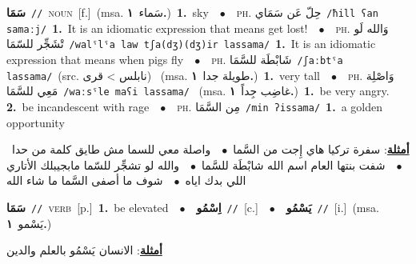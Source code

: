 \documentclass[10pt,a4paper,twoside]{article} %
\begin{document}
\begin{multicols}{2}
{\setlength\topsep{0pt}\textbf{\foreignlanguage{arabic}{سَمَا}}\ {\color{gray}\texttt{//}\color{black}}\ \textsc{noun}\ [f.]\ \color{gray}(msa. \foreignlanguage{arabic}{سَماء}~\foreignlanguage{arabic}{\textbf{١.}})\color{black}\ \textbf{1.}~sky\ \ $\bullet$\ \ \textsc{ph.} \color{gray} \foreignlanguage{arabic}{حِلّ عَن سَمَاي}\color{black}\ {\color{gray}\texttt{/{\sffamily ħill ʕan samaːj}/}\color{black}}\ \textbf{1.}~It is an idiomatic expression that means get lost!\ \ $\bullet$\ \ \textsc{ph.} \color{gray} \foreignlanguage{arabic}{وَالله لَو تْشَجِّر للسّمَا}\color{black}\ {\color{gray}\texttt{/{\sffamily walˤlˤa law tʃa(dʒ)(dʒ)ir lassama}/}\color{black}}\ \textbf{1.}~It is an idiomatic expression that means when pigs fly\ \ $\bullet$\ \ \textsc{ph.} \color{gray} \foreignlanguage{arabic}{شَابْطَة للسَّمَا}\color{black}\ {\color{gray}\texttt{/{\sffamily ʃaːbtˤa lassama}/}\color{black}}\ \color{gray}(src. \foreignlanguage{arabic}{نابلس > قرى})\color{black}\ \color{gray} (msa. \foreignlanguage{arabic}{طويلة جدا}~\foreignlanguage{arabic}{\textbf{١.}})\color{black}\ \textbf{1.}~very tall\ \ $\bullet$\ \ \textsc{ph.} \color{gray} \foreignlanguage{arabic}{وَاصْلِة مَعِي للسَّمَا}\color{black}\ {\color{gray}\texttt{/{\sffamily waːsˤle maʕi lassama}/}\color{black}}\ \color{gray} (msa. \foreignlanguage{arabic}{غاضِب جِداً}~\foreignlanguage{arabic}{\textbf{١.}})\color{black}\ \textbf{1.}~be very angry.  \textbf{2.}~be incandescent with rage\ \ $\bullet$\ \ \textsc{ph.} \color{gray} \foreignlanguage{arabic}{مِن السَّمَا}\color{black}\ {\color{gray}\texttt{/{\sffamily min ʔissama}/}\color{black}}\ \textbf{1.}~a golden opportunity\  \begin{flushright}\color{gray}\foreignlanguage{arabic}{\textbf{\underline{\foreignlanguage{arabic}{أمثلة}}}: سفرة تركيا هاي إِجت من السَّما\ $\bullet$\ \  واصلة معي للسما مش طايق كلمة من حدا\ $\bullet$\ \  شفت بنتها العام اسم الله شابْطَة للسَّما\ $\bullet$\ \  والله لو تشجِّر للسّما مابجيبلك الأتاري اللي بدك اياه\ $\bullet$\ \  شوف ما أصفى السَّما ما شاء الله}\end{flushright}\color{black}} \vspace{2mm}

{\setlength\topsep{0pt}\textbf{\foreignlanguage{arabic}{سَمَا}}\ {\color{gray}\texttt{//}\color{black}}\ \textsc{verb}\ [p.]\ \textbf{1.}~be elevated\ \ $\bullet$\ \ \setlength\topsep{0pt}\textbf{\foreignlanguage{arabic}{اِسْمُو}}\ {\color{gray}\texttt{//}\color{black}}\ [c.]\ \ $\bullet$\ \ \setlength\topsep{0pt}\textbf{\foreignlanguage{arabic}{يَسْمُو}}\ {\color{gray}\texttt{//}\color{black}}\ [i.]\ \color{gray}(msa. \foreignlanguage{arabic}{يَسْمو}~\foreignlanguage{arabic}{\textbf{١.}})\color{black}\  \begin{flushright}\color{gray}\foreignlanguage{arabic}{\textbf{\underline{\foreignlanguage{arabic}{أمثلة}}}: الانسان يَسْمُو بالعلم والدين}\end{flushright}\color{black}} \vspace{2mm}


\end{multicols}
\end{document}
